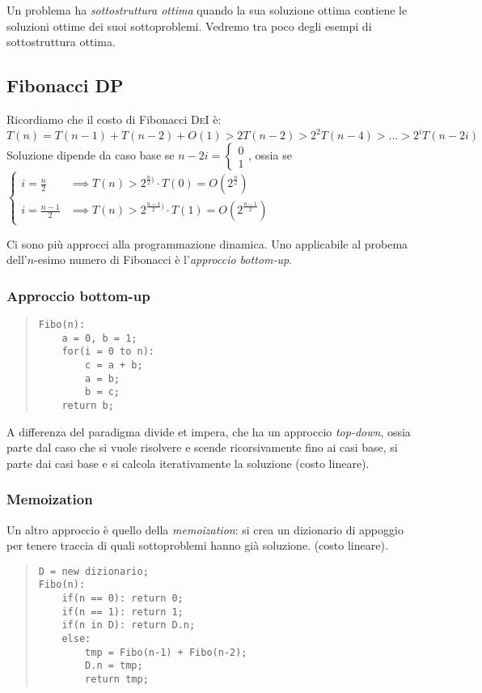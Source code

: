 \documentclass[a4paper,10pt]{article}
\theoremstyle{definition}
\begin{document}
Un problema ha \emph{sottostruttura ottima} quando la sua soluzione ottima contiene le soluzioni ottime dei suoi sottoproblemi. Vedremo tra poco degli esempi di sottostruttura ottima.

\subsection{Fibonacci DP}
Ricordiamo che il costo di Fibonacci \textsc{DeI} è:
\[T(n) = T(n-1) + T(n-2) + O(1)>2T(n-2)>2^2 T(n-4) > ... > 2^i T(n-2i)\]
Soluzione dipende da caso base se $n - 2i = \begin{cases}
                                             0\\1
                                            \end{cases}
$, ossia se $\begin{cases}
              i = \frac{n}{2} &\implies T(n) > 2^{\frac{n}{2})}\cdot T(0)  = O(2^\frac{n}{2}) \\
              i = \frac{n-1}{2}  &\implies T(n) > 2^{\frac{n-1}{2})}\cdot T(1)  = O(2^\frac{n-1}{2}) 
             \end{cases}$

Ci sono più approcci alla programmazione dinamica. Uno applicabile al probema dell'$n$-esimo numero di Fibonacci è l'\emph{approccio bottom-up}. 
\subsubsection{Approccio bottom-up}
\begin{multicols}{2}
\begin{quote}
 \begin{lstlisting}
Fibo(n):
    a = 0, b = 1;
    for(i = 0 to n):
        c = a + b;
        a = b;
        b = c;
    return b;
 \end{lstlisting}

\end{quote}
A differenza del paradigma divide et impera, che ha un approccio \emph{top-down}, ossia parte dal caso che si vuole risolvere e scende ricorsivamente fino ai casi base, si parte dai casi base e si calcola iterativamente la soluzione (costo lineare).


\end{multicols}
\subsubsection{Memoization}
Un altro approccio è quello della \emph{memoization}: si crea un dizionario di appoggio per tenere traccia di quali sottoproblemi hanno già soluzione. (costo lineare).
\begin{quote}
 \begin{lstlisting}
D = new dizionario;
Fibo(n):
    if(n == 0): return 0;
    if(n == 1): return 1;
    if(n in D): return D.n;
    else:
        tmp = Fibo(n-1) + Fibo(n-2);
        D.n = tmp;
        return tmp;
 \end{lstlisting}

\end{quote}
\newpage
\end{document}
